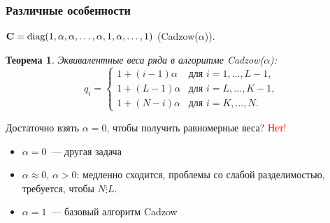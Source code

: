 \documentclass[unicode, notheorems]{beamer}
\newtheorem{theorem}{Теорема}
\begin{document}
\begin{frame}
	\frametitle{Различные особенности}
	 $\mathbf{C} = \text{diag}(1, \alpha, \alpha, \ldots, \alpha, 1, \alpha, \ldots, 1)$ (Cadzow($\alpha$)).
	\begin{theorem}
		Эквивалентные веса ряда в алгоритме Cadzow($\alpha$):
		\begin{equation*}
		q_i = \begin{cases}
		1 + (i - 1) \alpha & \text{для $i = 1, \ldots, L-1,$}\\
		1 + (L - 1) \alpha & \text{для $i = L, \ldots, K-1,$}\\
		1 + (N - i) \alpha & \text{для $i = K, \ldots, N.$}
		\end{cases}
	    \end{equation*}
	\end{theorem}
	
	Достаточно взять $\alpha = 0$, чтобы получить равномерные веса? \textcolor{red}{Нет!}
	\begin{itemize}
		\item  $\alpha = 0$~--- другая задача
		\item $\alpha \approx 0$, $\alpha > 0$: медленно сходится, проблемы со слабой разделимостью, требуется, чтобы $N \vdots L$.
		\item $\alpha = 1$~--- базовый алгоритм Cadzow
	\end{itemize}

\end{frame}

\end{document}

